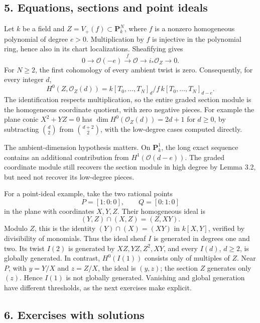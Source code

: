 \documentclass[11pt]{article}
\begin{document}
\subsection{5. Equations, sections and point
ideals}\label{equations-sections-and-point-ideals}

Let \(k\) be a field and \(Z=V_+(f)\subset\mathbf P_k^N\), where \(f\)
is a nonzero homogeneous polynomial of degree \(e>0\). Multiplication by
\(f\) is injective in the polynomial ring, hence also in its chart
localizations. Sheafifying gives \[
0\longrightarrow\mathcal O(-e)\xrightarrow{\ f\ }\mathcal O
\longrightarrow i_*\mathcal O_Z\longrightarrow0.
\] For \(N\ge2\), the first cohomology of every ambient twist is zero.
Consequently, for every integer \(d\), \[
H^0(Z,\mathcal O_Z(d))=k[T_0,\ldots,T_N]_d/f\,k[T_0,\ldots,T_N]_{d-e}.
\] The identification respects multiplication, so the entire graded
section module is the homogeneous coordinate quotient, with zero
negative pieces. For example the plane conic \(X^2+YZ=0\) has
\(\dim H^0(\mathcal O_Z(d))=2d+1\) for \(d\ge0\), by subtracting
\(\binom d2\) from \(\binom{d+2}2\), with the low-degree cases computed
directly.

The ambient-dimension hypothesis matters. On \(\mathbf P_k^1\), the long
exact sequence contains an additional contribution from
\(H^1(\mathcal O(d-e))\). The graded coordinate module still recovers
the section module in high degree by Lemma 3.2, but need not recover its
low-degree pieces.

For a point-ideal example, take the two rational points \[
P=[1:0:0],\qquad Q=[0:1:0]
\] in the plane with coordinates \(X,Y,Z\). Their homogeneous ideal is
\[
(Y,Z)\cap(X,Z)=(Z,XY).
\] Modulo \(Z\), this is the identity \((Y)\cap(X)=(XY)\) in \(k[X,Y]\),
verified by divisibility of monomials. Thus the ideal sheaf \(I\) is
generated in degrees one and two. Its twist \(I(2)\) is generated by
\(XZ,YZ,Z^2,XY\), and every \(I(d)\), \(d\ge2\), is globally generated.
In contrast, \(H^0(I(1))\) consists only of multiples of \(Z\). Near
\(P\), with \(y=Y/X\) and \(z=Z/X\), the ideal is \((y,z)\); the section
\(Z\) generates only \((z)\). Hence \(I(1)\) is not globally generated.
Vanishing and global generation have different thresholds, as the next
exercises make explicit.

\subsection{6. Exercises with solutions}\label{exercises-with-solutions}
\end{document}
